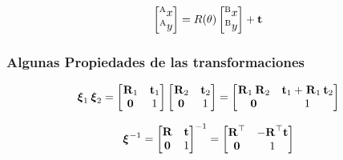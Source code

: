 \begin{frame}
    \begin{equation*}
        \begin{bmatrix}
            \toCoord{x}{A}\\
            \toCoord{y}{A}\\
        \end{bmatrix} = R(\theta )
        \begin{bmatrix}
            \toCoord{x}{B}\\
            \toCoord{y}{B}
       \end{bmatrix} + \translation
    \end{equation*}
\end{frame}


\begin{frame}
    \frametitle{Algunas Propiedades de las transformaciones}

    \begin{equation*}
        \transform{}{1}\transform{}{2} =
        \begin{bmatrix}
            \rotationCoord{}{1} & \translationCoord{}{1}\\
            \vec{0} & 1
        \end{bmatrix}
        \begin{bmatrix}
            \rotationCoord{}{2} & \translationCoord{}{2}\\
            \vec{0} & 1
        \end{bmatrix} =
        \begin{bmatrix}
            \rotationCoord{}{1}\rotationCoord{}{2} & \translationCoord{}{1}+\rotationCoord{}{1}\translationCoord{}{2}\\
            \vec{0} & 1
        \end{bmatrix}
    \end{equation*}


    \begin{equation*}
        \transform{}{}^{-1}=
        \begin{bmatrix}
            \rotation & \translation\\
            \vec{0} & 1
        \end{bmatrix}^{-1} =
        \begin{bmatrix}
            \rotation^{\top} & -\rotation^{\top}\translation\\
            \vec{0} & 1
        \end{bmatrix}
    \end{equation*}

\end{frame}


